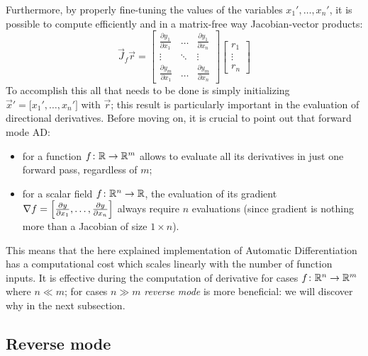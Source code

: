 Furthermore, by properly fine-tuning the values of the variables $x_1', \dots, x_n'$, it is possible to compute efficiently and in a matrix-free way Jacobian-vector products:
\[
\vec{J}_f \vec{r} =
\begin{bmatrix}
	\frac{\partial y_1}{\partial x_1} &  \dots  & \frac{\partial y_1}{\partial x_n}  \\
	\vdots							  & \ddots  & \vdots							 \\
	\frac{\partial y_m}{\partial x_1} &  \dots  & \frac{\partial y_m}{\partial x_n}
\end{bmatrix}
\begin{bmatrix}
	r_1		\\
	\vdots  \\
	r_n
\end{bmatrix}
\]
To accomplish this all that needs to be done is simply initializing $\vec{x}'=\big[x_1', \dots, x_n' \big]$ with $\vec{r}$; this result is particularly important in the evaluation of directional derivatives.
Before moving on, it is crucial to point out that forward mode AD:
\begin{itemize}
	\item for a function $f \colon \mathbb{R} \to \mathbb{R}^m$ allows to evaluate all its derivatives in just one forward pass, regardless of $m$;
	\item for a scalar field $f \colon \mathbb{R}^n \to \mathbb{R}$, the evaluation of its gradient $\nabla f = \Bigl[ \frac{\partial y}{\partial x_1}, \dots, \frac{\partial y}{\partial x_n} \Bigr]$ always require $n$ evaluations (since gradient is nothing more than a Jacobian of size $1 \times n$).
\end{itemize}
This means that the here explained implementation of Automatic Differentiation has a computational cost which scales linearly with the number of function inputs. It is effective during the computation of derivative for cases $f \colon \mathbb{R}^n \to \mathbb{R}^m$ where $n \ll m$; for cases $n \gg m$ \emph{reverse mode} is more beneficial: we will discover why in the next subsection.


\subsection{Reverse mode}
\label{subsec:reverse_mode_AD}

